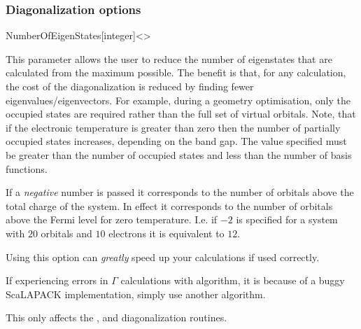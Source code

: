 \subsubsection{Diagonalization options}

\begin{fdfentry}{NumberOfEigenStates}[integer]<>

  This parameter allows the user to reduce the number of eigenstates
  that are calculated from the maximum possible. The benefit is that,
  for any calculation, the cost of the diagonalization is reduced by
  finding fewer eigenvalues/eigenvectors. For example, during a
  geometry optimisation, only the occupied states are required rather
  than the full set of virtual orbitals. Note, that if the electronic
  temperature is greater than zero then the number of partially
  occupied states increases, depending on the band gap. The value
  specified must be greater than the number of occupied states and
  less than the number of basis functions.

  If a \emph{negative} number is passed it corresponds to the number
  of orbitals above the total charge of the system. In effect it
  corresponds to the number of orbitals above the Fermi level for zero
  temperature. I.e. if $-2$ is specified for a system with $20$
  orbitals and $10$ electrons it is equivalent to $12$.

  Using this option can \emph{greatly} speed up your calculations if
  used correctly.

  \note If experiencing  errors in $\Gamma$
  calculations with  algorithm, it is because of a buggy
  ScaLAPACK implementation, simply use another algorithm.

  \note This only affects the ,  and
   diagonalization routines.
  
\end{fdfentry}


